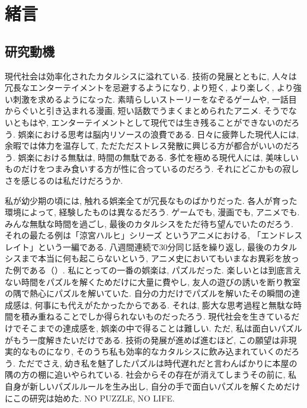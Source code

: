 \chapter{緒言}
\section{研究動機}\label{section:Motivation}
現代社会は効率化されたカタルシスに溢れている. 技術の発展とともに, 人々は冗長なエンターテイメントを忌避するようになり, より短く, より楽しく, より強い刺激を求めるようになった. 素晴らしいストーリーをなぞるゲームや, 一話目からぐいと引き込まれる漫画, 短い話数でうまくまとめられたアニメ. そうでないともはや, エンターテイメントとして現代では生き残ることができないのだろう. 娯楽における思考は脳内リソースの浪費である. 日々に疲弊した現代人には, 余暇では体力を温存して, ただただストレス発散に興じる方が都合がいいのだろう. 娯楽における無駄は, 時間の無駄である. 多忙を極める現代人には, 美味しいものだけをつまみ食いする方が性に合っているのだろう. それにどこかもの寂しさを感じるのは私だけだろうか.

私が幼少期の頃には, 触れる娯楽全てが冗長なものばかりだった. 各人が育った環境によって, 経験したものは異なるだろう. ゲームでも, 漫画でも, アニメでも. みんな無駄な時間を過ごし, 最後のカタルシスをただ待ち望んでいたのだろう. それの最たる例は「涼宮ハルヒ」シリーズ \cite{web:Haruhi}というアニメにおける, 「エンドレスレイト」という一編である. 八週間連続で30分同じ話を繰り返し, 最後のカタルシスまで本当に何も起こらないという, アニメ史においてもいまなお異彩を放った例である（\cite{web:EndlessEight}）.
私にとっての一番の娯楽は, パズルだった. 楽しいとは到底言えない時間をパズルを解くためだけに大量に費やし, 友人の遊びの誘いを断り教室の隅で熱心にパズルを解いていた. 自分の力だけでパズルを解いたその瞬間の達成感は, 何事にも代えがたかったからである. それは, 膨大な思考過程と無駄な時間を積み重ねることでしか得られないものだったろう. 現代社会を生きているだけでそこまでの達成感を, 娯楽の中で得ることは難しい. ただ, 私は面白いパズルがもう一度解きたいだけである. 技術の発展が進めば進むほど, この願望は非現実的なものになり, そのうち私も効率的なカタルシスに飲み込まれていくのだろう. ただでさえ, 幼き私を魅了したパズルは時代遅れだと言わんばかりに本屋の隅の方の棚に追いやられている. 社会からその存在が消えてしまうその前に, 私自身が新しいパズルルールを生み出し, 自分の手で面白いパズルを解くためだけにこの研究は始めた. NO PUZZLE, NO LIFE.

